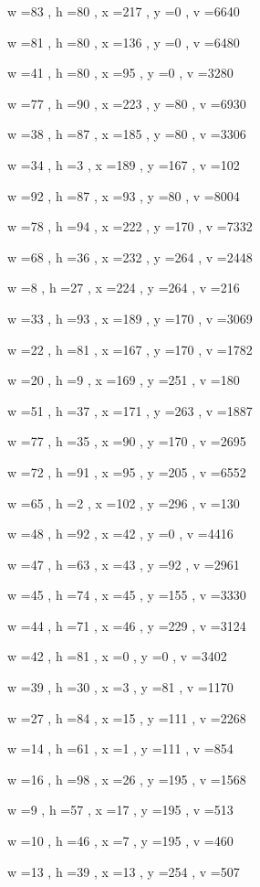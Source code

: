 \documentclass[11pt]{article}
\begin{document}
w =83 , h =80 , x =217 , y =0 , v =6640
\par
w =81 , h =80 , x =136 , y =0 , v =6480
\par
w =41 , h =80 , x =95 , y =0 , v =3280
\par
w =77 , h =90 , x =223 , y =80 , v =6930
\par
w =38 , h =87 , x =185 , y =80 , v =3306
\par
w =34 , h =3 , x =189 , y =167 , v =102
\par
w =92 , h =87 , x =93 , y =80 , v =8004
\par
w =78 , h =94 , x =222 , y =170 , v =7332
\par
w =68 , h =36 , x =232 , y =264 , v =2448
\par
w =8 , h =27 , x =224 , y =264 , v =216
\par
w =33 , h =93 , x =189 , y =170 , v =3069
\par
w =22 , h =81 , x =167 , y =170 , v =1782
\par
w =20 , h =9 , x =169 , y =251 , v =180
\par
w =51 , h =37 , x =171 , y =263 , v =1887
\par
w =77 , h =35 , x =90 , y =170 , v =2695
\par
w =72 , h =91 , x =95 , y =205 , v =6552
\par
w =65 , h =2 , x =102 , y =296 , v =130
\par
w =48 , h =92 , x =42 , y =0 , v =4416
\par
w =47 , h =63 , x =43 , y =92 , v =2961
\par
w =45 , h =74 , x =45 , y =155 , v =3330
\par
w =44 , h =71 , x =46 , y =229 , v =3124
\par
w =42 , h =81 , x =0 , y =0 , v =3402
\par
w =39 , h =30 , x =3 , y =81 , v =1170
\par
w =27 , h =84 , x =15 , y =111 , v =2268
\par
w =14 , h =61 , x =1 , y =111 , v =854
\par
w =16 , h =98 , x =26 , y =195 , v =1568
\par
w =9 , h =57 , x =17 , y =195 , v =513
\par
w =10 , h =46 , x =7 , y =195 , v =460
\par
w =13 , h =39 , x =13 , y =254 , v =507
\par
\newpage
\end{document}
